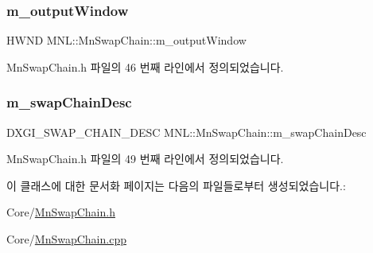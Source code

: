 \subsubsection{\texorpdfstring{m\+\_\+output\+Window}{m\_outputWindow}}
{\footnotesize\ttfamily H\+W\+ND M\+N\+L\+::\+Mn\+Swap\+Chain\+::m\+\_\+output\+Window\hspace{0.3cm}{\ttfamily [private]}}



Mn\+Swap\+Chain.\+h 파일의 46 번째 라인에서 정의되었습니다.

\mbox{\label{class_m_n_l_1_1_mn_swap_chain_af6fefb453e8ef1cb4516e4d6846cf757}} 
\subsubsection{\texorpdfstring{m\+\_\+swap\+Chain\+Desc}{m\_swapChainDesc}}
{\footnotesize\ttfamily D\+X\+G\+I\+\_\+\+S\+W\+A\+P\+\_\+\+C\+H\+A\+I\+N\+\_\+\+D\+E\+SC M\+N\+L\+::\+Mn\+Swap\+Chain\+::m\+\_\+swap\+Chain\+Desc\hspace{0.3cm}{\ttfamily [private]}}



Mn\+Swap\+Chain.\+h 파일의 49 번째 라인에서 정의되었습니다.



이 클래스에 대한 문서화 페이지는 다음의 파일들로부터 생성되었습니다.\+:\begin{DoxyCompactItemize}
\item 
Core/\hyperlink{_mn_swap_chain_8h}{Mn\+Swap\+Chain.\+h}\item 
Core/\hyperlink{_mn_swap_chain_8cpp}{Mn\+Swap\+Chain.\+cpp}\end{DoxyCompactItemize}
